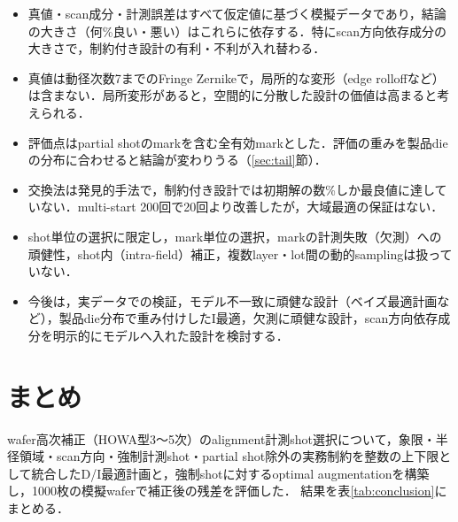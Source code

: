 \documentclass[10.5pt,a4paper]{ltjsarticle}
\begin{document}
\begin{itemize}
  \item 真値・scan成分・計測誤差はすべて仮定値に基づく模擬データであり，結論の大きさ（何\%良い・悪い）はこれらに依存する．特にscan方向依存成分の大きさで，制約付き設計の有利・不利が入れ替わる．
  \item 真値は動径次数7までのFringe Zernikeで，局所的な変形（edge rolloffなど）は含まない．局所変形があると，空間的に分散した設計の価値は高まると考えられる．
  \item 評価点はpartial shotのmarkを含む全有効markとした．評価の重みを製品dieの分布に合わせると結論が変わりうる（\ref{sec:tail}節）．
  \item 交換法は発見的手法で，制約付き設計では初期解の数\%しか最良値に達していない．multi-start 200回で20回より改善したが，大域最適の保証はない．
  \item shot単位の選択に限定し，mark単位の選択，markの計測失敗（欠測）への頑健性，shot内（intra-field）補正，複数layer・lot間の動的samplingは扱っていない．
  \item 今後は，実データでの検証，モデル不一致に頑健な設計（ベイズ最適計画など），製品die分布で重み付けしたI最適，欠測に頑健な設計，scan方向依存成分を明示的にモデルへ入れた設計を検討する．
\end{itemize}

\section{まとめ}

wafer高次補正（HOWA型3〜5次）のalignment計測shot選択について，象限・半径領域・scan方向・強制計測shot・partial shot除外の実務制約を整数の上下限として統合したD/I最適計画と，強制shotに対するoptimal augmentationを構築し，1000枚の模擬waferで補正後の残差を評価した．
結果を表\ref{tab:conclusion}にまとめる．
\end{document}
